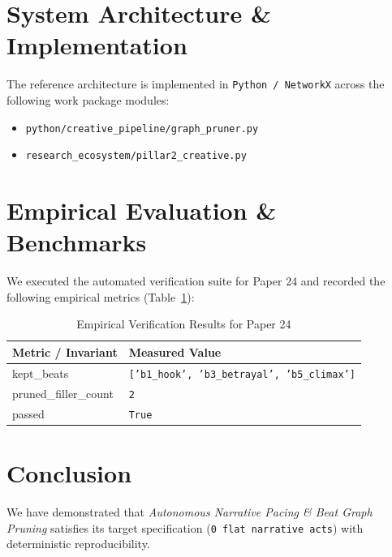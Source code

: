 \documentclass[10pt,twocolumn]{article}
\begin{document}
\section{System Architecture \& Implementation}
The reference architecture is implemented in \texttt{Python / NetworkX} across the following work package modules:
\begin{itemize}
  \item \texttt{python/creative\_pipeline/graph\_pruner.py}
  \item \texttt{research\_ecosystem/pillar2\_creative.py}
\end{itemize}

\section{Empirical Evaluation \& Benchmarks}
We executed the automated verification suite for Paper 24 and recorded the following empirical metrics (Table~\ref{tab:metrics}):

\begin{table}[htbp]
\centering
\caption{Empirical Verification Results for Paper 24}
\label{tab:metrics}
\begin{tabular}{ll}
\toprule
\textbf{Metric / Invariant} & \textbf{Measured Value} \\
\midrule
    kept\_beats & \texttt{['b1\_hook', 'b3\_betrayal', 'b5\_climax']} \\
    pruned\_filler\_count & \texttt{2} \\
    passed & \texttt{True} \\
\bottomrule
\end{tabular}
\end{table}

\section{Conclusion}
We have demonstrated that \textit{Autonomous Narrative Pacing \& Beat Graph Pruning} satisfies its target specification (\texttt{0 flat narrative acts}) with deterministic reproducibility.



\end{document}
